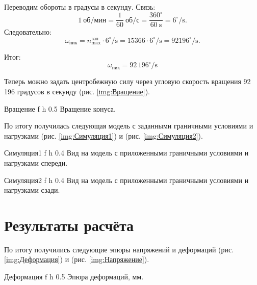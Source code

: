Переводим обороты в градусы в секунду. Связь:
\[
1\ \text{об/мин} = \frac{1}{60}\ \text{об/с} = \frac{360^\circ}{60\ \text{s}} = 6^\circ/\text{s}.
\]
Следовательно:
\[
\omega_{\text{пик}} = n_{\max}^{\text{вал}}\cdot 6^\circ/\text{s}
= 15366 \cdot 6^\circ/\text{s} = 92196^\circ/\text{s}.
\]

Итог:
\[
\omega_{\text{пик}} = 92\,196^\circ/\text{s}
\]

Теперь можно задать центробежную силу через угловую скорость вращения 92 196 градусов в секунду (рис. \ref{img:Вращение}).

    {Вращение} %
    {f} %
    {h} %
    {0.5\textwidth} %
    {Вращение конуса.} %

\newpage

По итогу получилась следующая модель с заданными граничными условиями и нагрузками (рис. \ref{img:Симуляция1}) и (рис. \ref{img:Симуляция2}).

    {Симуляция1} %
    {f} %
    {h} %
    {0.4\textwidth} %
    {Вид на модель с приложенными граничными условиями и нагрузками спереди.} %

    {Симуляция2} %
    {f} %
    {h} %
    {0.4\textwidth} %
    {Вид на модель с приложенными граничными условиями и нагрузками сзади.} %

\newpage

\section*{Результаты расчёта}

По итогу получились следующие эпюры напряжений и деформаций (рис. \ref{img:Деформация}) и (рис. \ref{img:Напряжение}).

    {Деформация} %
    {f} %
    {h} %
    {0.5\textwidth} %
    {Эпюра деформаций, мм.} %

